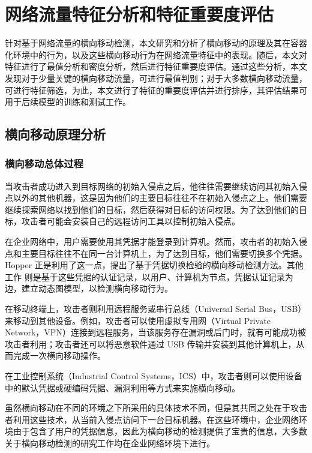 \chapter{网络流量特征分析和特征重要度评估}{
{
\let\cleardoublepage\relax
}
\label{chap:analyze}

针对基于网络流量的横向移动检测，本文研究和分析了横向移动的原理及其在容器化环境中的行为，以及这些横向移动行为在网络流量特征中的表现。随后，本文对特征进行了最值分析和密度分析，然后进行特征重要度评估。通过这些分析，本文发现对于少量关键的横向移动流量，可进行最值判别；对于大多数横向移动流量，可进行特征筛选，为此，本文进行了特征的重要度评估并进行排序，其评估结果可用于后续模型的训练和测试工作。

\section{横向移动原理分析}
\label{sec:theory}

\subsection{横向移动总体过程}

当攻击者成功进入到目标网络的初始入侵点之后，他往往需要继续访问其初始入侵点以外的其他机器，这是因为他们的主要目标往往不在初始入侵点之上。他们需要继续探索网络以找到他们的目标，然后获得对目标的访问权限。为了达到他们的目标，攻击者可能会安装自己的远程访问工具以控制初始入侵点。

在企业网络中，用户需要使用其凭据才能登录到计算机。然而，攻击者的初始入侵点和主要目标往往不在同一台计算机上，为了达到目标，他们需要切换多个凭据。Hopper \citep{ho2021hopper} 正是利用了这一点，提出了基于凭据切换检验的横向移动检测方法。其他工作 \citep{king2023euler, khoury2023jbeil} 则是基于这些凭据的认证记录，以用户、计算机为节点，凭据认证记录为边，建立动态图模型，以检测横向移动行为。

在移动终端上，攻击者则利用远程服务或串行总线（Universal Serial Bus，USB）来移动到其他设备\citep{mitre2024lm}。例如，攻击者可以使用虚拟专用网（Virtual Private Network，VPN）连接到远程服务，当该服务存在漏洞或后门时，就有可能成功被攻击者利用；攻击者还可以将恶意软件通过 USB 传输并安装到其他计算机上，从而完成一次横向移动操作。

在工业控制系统（Industrial Control Systems，ICS）中，攻击者则可以使用设备中的默认凭据或硬编码凭据、漏洞利用等方式来实施横向移动\citep{mitre2024ics}。

虽然横向移动在不同的环境之下所采用的具体技术不同，但是其共同之处在于攻击者利用这些技术，从当前入侵点访问下一台目标机器。在这些环境中，企业网络环境由于包含了用户的凭据信息，因此为横向移动的检测提供了宝贵的信息，大多数关于横向移动检测的研究工作均在企业网络环境下进行。

}
